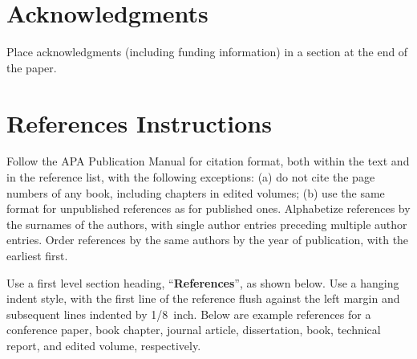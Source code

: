 \documentclass[10pt,letterpaper]{article}
\begin{document}
\section{Acknowledgments}

Place acknowledgments (including funding information) in a section at
the end of the paper.


\section{References Instructions}

Follow the APA Publication Manual for citation format, both within the
text and in the reference list, with the following exceptions: (a) do
not cite the page numbers of any book, including chapters in edited
volumes; (b) use the same format for unpublished references as for
published ones. Alphabetize references by the surnames of the authors,
with single author entries preceding multiple author entries. Order
references by the same authors by the year of publication, with the
earliest first.

Use a first level section heading, ``{\bf References}'', as shown
below. Use a hanging indent style, with the first line of the
reference flush against the left margin and subsequent lines indented
by 1/8~inch. Below are example references for a conference paper, book
chapter, journal article, dissertation, book, technical report, and
edited volume, respectively.

\nocite{ChalnickBillman1988a}
\nocite{Feigenbaum1963a}
\nocite{Hill1983a}
\nocite{OhlssonLangley1985a}
\nocite{Matlock2001}
\nocite{NewellSimon1972a}
\nocite{ShragerLangley1990a}




\setlength{\bibleftmargin}{.125in}
\setlength{\bibindent}{-\bibleftmargin}


\end{document}
